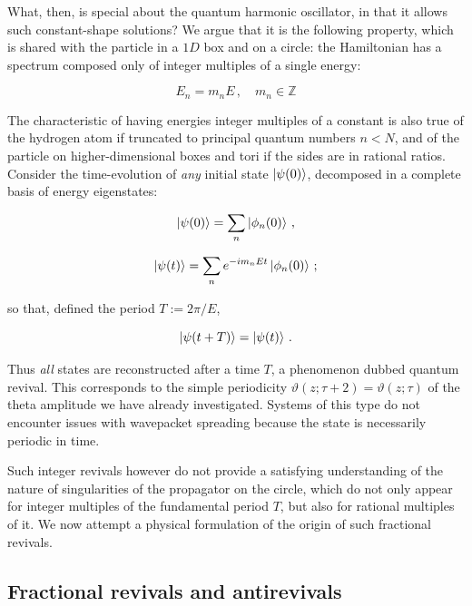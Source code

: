\documentclass{article}
\newcommand{\T}{\ensuremath{\vartheta}}
\begin{document}
What, then, is special about the quantum harmonic oscillator, in that it allows such constant-shape solutions? We argue that it is the following property, which is shared with the particle in a $1D$ box and on a circle: the Hamiltonian has a spectrum composed only of integer multiples of a single energy:

\begin{equation}
    E_n = m_n E\,,\quad m_n \in \mathbb{Z}
\end{equation}

The characteristic of having energies integer multiples of a constant is also true of the hydrogen atom if truncated to principal quantum numbers $n < N$, and of the particle on higher-dimensional boxes and tori if the sides are in rational ratios. Consider the time-evolution of \emph{any} initial state $\ket{\psi(0)}$, decomposed in a complete basis of energy eigenstates:

\begin{equation}
    \ket{\psi(0)} = \sum_n \ket{\phi_n(0)}\,,
\end{equation}

\begin{equation}
    \ket{\psi(t)} = \sum_n e^{-i m_n E t} \ket{\phi_n(0)}\,;
\end{equation}

so that, defined the period $T := 2\pi / E$,

\begin{equation}
    \ket{\psi(t+T)} = \ket{\psi(t)}\,.
\end{equation}

Thus \emph{all} states are reconstructed after a time $T$, a phenomenon dubbed quantum revival. This corresponds to the simple periodicity $\T(z;\tau+2) = \T(z;\tau)$ of the theta amplitude we have already investigated. Systems of this type do not encounter issues with wavepacket spreading because the state is necessarily periodic in time.

Such integer revivals however do not provide a satisfying understanding of the nature of singularities of the propagator on the circle, which do not only appear for integer multiples of the fundamental period $T$, but also for rational multiples of it. We now attempt a physical formulation of the origin of such fractional revivals.

\subsection{Fractional revivals and antirevivals}
\end{document}
